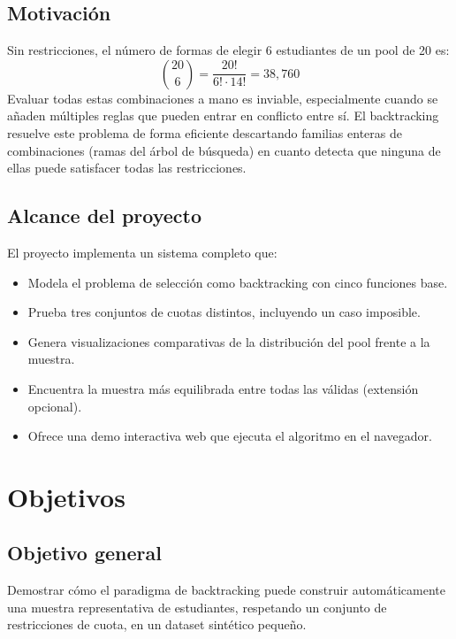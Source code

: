 \documentclass[12pt, a4paper]{article}
\begin{document}
\subsection{Motivación}

Sin restricciones, el número de formas de elegir 6 estudiantes de un pool de 20 es:
\[
  \binom{20}{6} = \frac{20!}{6! \cdot 14!} = 38{,}760
\]
Evaluar todas estas combinaciones a mano es inviable, especialmente cuando se añaden múltiples reglas que pueden entrar en conflicto entre sí. El backtracking resuelve este problema de forma eficiente descartando familias enteras de combinaciones (ramas del árbol de búsqueda) en cuanto detecta que ninguna de ellas puede satisfacer todas las restricciones.

\subsection{Alcance del proyecto}

El proyecto implementa un sistema completo que:
\begin{itemize}[noitemsep]
  \item Modela el problema de selección como backtracking con cinco funciones base.
  \item Prueba tres conjuntos de cuotas distintos, incluyendo un caso imposible.
  \item Genera visualizaciones comparativas de la distribución del pool frente a la muestra.
  \item Encuentra la muestra más equilibrada entre todas las válidas (extensión opcional).
  \item Ofrece una demo interactiva web que ejecuta el algoritmo en el navegador.
\end{itemize}

\section{Objetivos}

\subsection{Objetivo general}

Demostrar cómo el paradigma de backtracking puede construir automáticamente una muestra representativa de estudiantes, respetando un conjunto de restricciones de cuota, en un dataset sintético pequeño.
\end{document}
